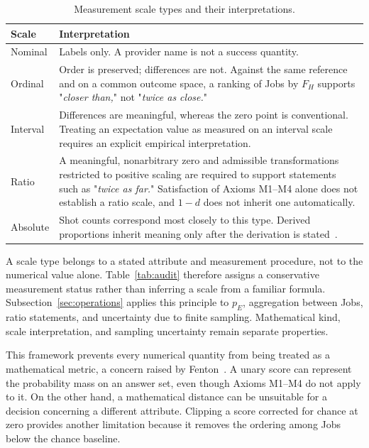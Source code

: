 \documentclass[10pt,conference]{IEEEtran}
\newcommand{\HF}{F_{H}}
\begin{document}
\begin{table}[ht]
\centering
\caption{Measurement scale types and their interpretations.}
\label{tab:scale-types}
\renewcommand{\arraystretch}{1.08}
\begin{tabularx}{\columnwidth}{@{}p{}X@{}}
\toprule
\textbf{Scale} & \textbf{Interpretation} \\
\midrule
Nominal & Labels only. A provider name is not a success quantity. \\
Ordinal & Order is preserved; differences are not. Against the same reference and on a common outcome space, a ranking of Jobs by $\HF$ supports "\textit{closer than,}" not "\textit{twice as close.}" \\
Interval & Differences are meaningful, whereas the zero point is conventional. Treating an expectation value as measured on an interval scale requires an explicit empirical interpretation. \\
Ratio & A meaningful, nonarbitrary zero and admissible transformations restricted to positive scaling are required to support statements such as "\textit{twice as far.}" Satisfaction of Axioms M1--M4 alone does not establish a ratio scale, and $1-d$ does not inherit one automatically. \\
Absolute & Shot counts correspond most closely to this type. Derived proportions inherit meaning only after the derivation is stated~\cite{fentonBieman2015}. \\
\bottomrule
\end{tabularx}
\end{table}

A scale type belongs to a stated attribute and measurement procedure, not to the numerical value alone. Table~\ref{tab:audit} therefore assigns a conservative measurement status rather than inferring a scale from a familiar formula. Subsection~\ref{sec:operations} applies this principle to $p_E$, aggregation between Jobs, ratio statements, and uncertainty due to finite sampling. Mathematical kind, scale interpretation, and sampling uncertainty remain separate properties.

This framework prevents every numerical quantity from being treated as a mathematical metric, a concern raised by Fenton~\cite{fenton1994,fenton1992}. A unary score can represent the probability mass on an answer set, even though Axioms M1--M4 do not apply to it. On the other hand, a mathematical distance can be unsuitable for a decision concerning a different attribute. Clipping a score corrected for chance at zero provides another limitation because it removes the ordering among Jobs below the chance baseline.
\end{document}
